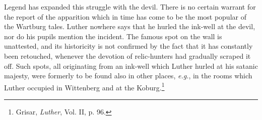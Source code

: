 Legend has expanded this struggle with the devil. There is no certain warrant
for the report of the apparition which in time has come
to be the most popular of the Wartburg tales. Luther nowhere says
that he hurled the ink-well at the devil, nor do his pupils mention
the incident. The famous spot on the wall is unattested, and its historicity
is not confirmed by the fact that it has constantly been retouched,
whenever the devotion of relic-hunters had gradually scraped
it off. Such spots, all originating from an ink-well which Luther
hurled at his satanic majesty, were formerly to be found also in other
places, \textit{e.g.}, in the rooms which Luther occupied in Wittenberg and
at the Koburg.\footnote{Grisar, \textit{Luther}, Vol. II, p. 96.}
